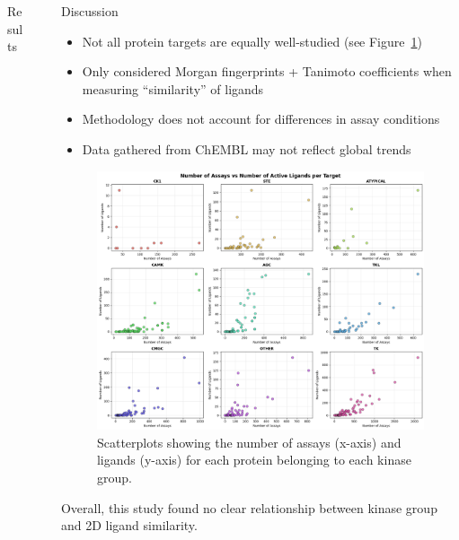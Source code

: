 \documentclass[final]{beamer}
\newlength{\sepwidth}
\newlength{\colwidth}
\newcommand{\separatorcolumn}{\begin{column}{\sepwidth}\end{column}}
\begin{document}
\begin{frame}[t]
\begin{columns}[t]
\begin{column}{\colwidth}
\begin{block}{Results}
  \end{block}

\end{column}

\separatorcolumn

\begin{column}{\colwidth} 
  \begin{block}{Discussion}
    \begin{itemize}
        \item Not all protein targets are equally well-studied (see Figure~\ref{assay_vs_ligand_plot})
        \item Only considered Morgan fingerprints + Tanimoto coefficients when measuring ``similarity'' of ligands
        \item Methodology does not account for differences in assay conditions
        \item Data gathered from ChEMBL may not reflect global trends
    \end{itemize}

    \begin{figure}
        \centering
        \includegraphics[width=\textwidth]{figures/assay_vs_ligand.png}
        \caption{Scatterplots showing the number of assays (x-axis) and ligands (y-axis) for each protein belonging to each kinase group.}
        \label{assay_vs_ligand_plot}
    \end{figure}

      Overall, this study found no clear relationship between kinase group and 2D ligand similarity.
  \end{block}


\end{column}
\end{columns}
\end{frame}
\end{document}
